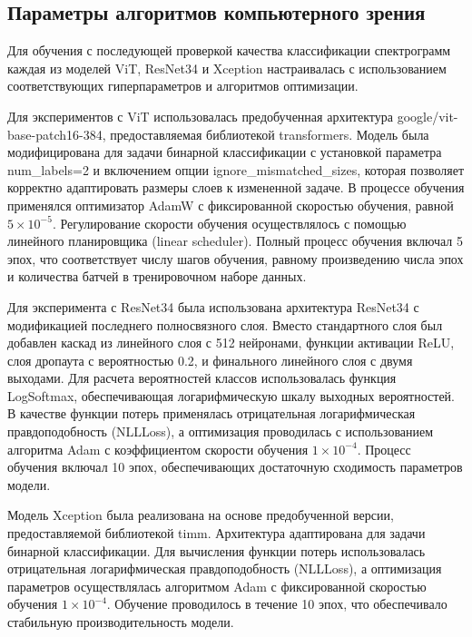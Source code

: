 \documentclass[spec, och, diploma]{SCWorks}
\begin{document}
    \subsection{Параметры алгоритмов компьютерного зрения}
        
        Для обучения с последующей проверкой качества классификации спектрограмм
        каждая из моделей ViT, ResNet34 и Xception настраивалась с
        использованием соответствующих гиперпараметров и алгоритмов оптимизации.

        Для экспериментов с ViT использовалась предобученная архитектура
        google/vit-base-patch16-384, предоставляемая библиотекой transformers.
        Модель была модифицирована для задачи бинарной классификации с
        установкой параметра num_labels=2 и включением опции
        ignore_mismatched_sizes, которая позволяет корректно адаптировать
        размеры слоев к измененной задаче. В процессе обучения применялся
        оптимизатор AdamW с фиксированной скоростью обучения, равной \(5 \times
        10^{-5}\). Регулирование скорости обучения осуществлялось с помощью
        линейного планировщика (linear scheduler). Полный процесс обучения
        включал 5 эпох, что соответствует числу шагов обучения, равному
        произведению числа эпох и количества батчей в тренировочном наборе
        данных. 
        
        Для эксперимента с ResNet34 была использована архитектура ResNet34 с
        модификацией последнего полносвязного слоя. Вместо стандартного слоя был
        добавлен каскад из линейного слоя с 512 нейронами, функции активации
        ReLU, слоя дропаута с вероятностью 0.2, и финального линейного слоя с
        двумя выходами. Для расчета вероятностей классов использовалась функция
        LogSoftmax, обеспечивающая логарифмическую шкалу выходных вероятностей.
        В качестве функции потерь применялась отрицательная логарифмическая
        правдоподобность (NLLLoss), а оптимизация проводилась с использованием
        алгоритма Adam с коэффициентом скорости обучения \(1 \times 10^{-4}\).
        Процесс обучения включал 10 эпох, обеспечивающих достаточную сходимость
        параметров модели. 
        
        Модель Xception была реализована на основе предобученной версии,\\
        предоставляемой библиотекой timm. Архитектура адаптирована для задачи
        бинарной классификации. Для вычисления функции потерь использовалась
        отрицательная логарифмическая правдоподобность (NLLLoss), а оптимизация
        параметров осуществлялась алгоритмом Adam с фиксированной скоростью
        обучения \(1 \times 10^{-4}\). Обучение проводилось в течение 10 эпох,
        что обеспечивало стабильную производительность модели. 
        
\end{document}
